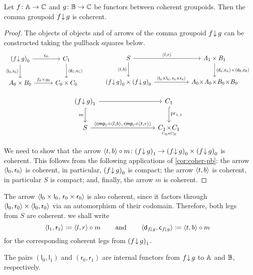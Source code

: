 \documentclass[a4paper,11pt]{amsart}
\newcommand{\kpdcincat}[1]{\argpdf{#1}\hspace{-2ex}\underset{\mbox{\tiny$\obgpdf{#1}\!\!\times\!\!\obgpdf{#1}$}}{\times}\hspace{-2ex}\argpdf{#1}}
\newcommand{\Ckpdcin}{\kpdcincat{C}}
\newcommand{\cmmcatincat}[2]{#1 \downarrow #2}
\newcommand{\domcommin}[2]{\domincat{\cmmcatincat{#1}{#2}}}
\newcommand{\codcommin}[2]{\codincat{\cmmcatincat{#1}{#2}}}
\newcommand{\fgcmmcatin}{\cmmcatincat{f\hspace{-.5ex}}{\hspace{-.2ex}g}}
\newcommand{\fgobcmmin}{\obgpdf{(\fgcmmcatin)}}
\newcommand{\fgarcmmin}{\argpdf{(\fgcmmcatin)}}
\newcommand{\fgdomcomm}{\domcommin{f\!}{g}}
\newcommand{\fgcodcomm}{\codcommin{f\!}{g}}
\begin{document}
\begin{prop}\label{prop:comma-objs}
	Let $f\colon\mathbb{A}\to\mathbb{C}$ and $g\colon\mathbb{B}\to\mathbb{C}$ be functors between coherent groupoids.
	Then the comma groupoid $\fgcmmcatin$ is coherent.
\end{prop}

\begin{proof}
	The objects of objects and of arrows of the comma groupoid $\fgcmmcatin$
	can be constructed taking the pullback squares below.
	\[\begin{tikzcd}[column sep=7ex, row sep=5ex]
		\fgobcmmin	\ar[d,"\ple{\mathsf{l}_0,\mathsf{r}_0}"'] \ar[r,"\mathsf{c}_0"]
		&	\Cargpdf	\ar[d,"\ple{\Cdomgpdf,\Ccodgpdf}"]
		\\
		\Aobgpdf \times \Bobgpdf	\ar[r,"{f_0\times g_0}"]
		&	\Cobgpdf \times \Cobgpdf
	\end{tikzcd}
	\hspace{7ex}
	\begin{tikzcd}[column sep=13ex, row sep=5ex]
		S	\ar[d,"\ple{t,b}"'] \ar[r,"\ple{l,r}"]
		&	\Aargpdf \times \Bargpdf	\ar[d,"\ple{\Adomgpdf,\Acodgpdf}\times \ple{\Bdomgpdf,\Bcodgpdf}"]
		\\
		\fgobcmmin \times \fgobcmmin	\ar[r,"\ple{\mathsf{l}_0 \times \mathsf{l}_0,\,\mathsf{r}_0 \times \mathsf{r}_0}"]
		&	\Aobgpdf \stimes \Aobgpdf \stimes \Bobgpdf \stimes \Bobgpdf
	\end{tikzcd}\]
	
	\vspace{1ex}
	\[\begin{tikzcd}[column sep=19ex, row sep=5ex]
		\fgarcmmin	\ar[d,"m"',hook] \ar[r]	&	\Cargpdf	\ar[d,"\pr{1,1}",hook]
		\\
		S	\ar[r,"\ple{\Ccmpgpdf \arcmp\ple{l,b},\,\Ccmpgpdf \arcmp\ple{t,r}}"]
		&	\Ckpdcin
	\end{tikzcd}\]
	
	We need to show that the arrow $\ple{t,b}\arcmp m\colon \fgarcmmin \to \fgobcmmin \times \fgobcmmin$ is coherent.
	This follows from the following applications of \cref{cor:coher-pb}:
	the arrow $\langle{\mathsf{l}_0,\mathsf{r}_0}\rangle$ is coherent, in particular, $\fgobcmmin$ is compact;
	the arrow $\langle{t,b}\rangle$ is coherent, in particular $S$ is compact;
	and, finally, the arrow $m$ is coherent.
\end{proof}

\begin{rmk}\label{rmk:comma-objs}
	The arrow $\langle{\mathsf{l}_0 \times \mathsf{l}_0,\,\mathsf{r}_0 \times \mathsf{r}_0}\rangle$ is also coherent,
	since it factors through $\langle{\mathsf{l}_0,\mathsf{r}_0}\rangle\times \langle{\mathsf{l}_0,\mathsf{r}_0}\rangle$ via an automorphism of their codomain.
	Therefore, both legs from $S$ are coherent.
	we shall write
	\[
	\ple{\mathsf{l}_1,\mathsf{r}_1}\coloneqq \ple{l,r}\arcmp m
	\hspace{5ex}\text{and}\hspace{5ex}
	\ple{\fgdomcomm,\fgcodcomm}\coloneqq \ple{t,b}\arcmp m
	\]
	for the corresponding coherent legs from $\fgarcmmin$.
	
	The pairs $(\mathsf{l}_0,\mathsf{l}_1)$ and $(\mathsf{r}_0,\mathsf{r}_1)$ are internal functors from $\fgcmmcatin$ to $\mathbb{A}$ and $\mathbb{B}$, respectively.
\end{rmk}
\end{document}

